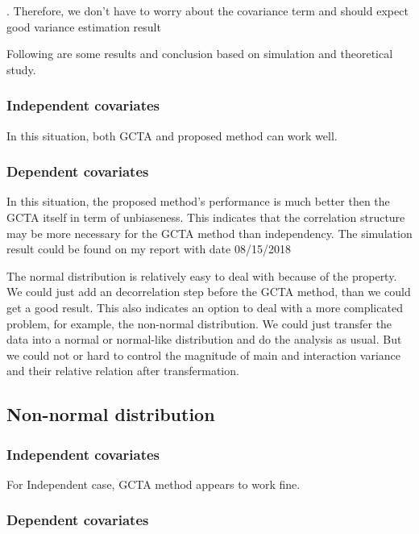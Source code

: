 \documentclass[]{article}
\begin{document}
. Therefore, we don't have to worry about the covariance term and should
expect good variance estimation result

Following are some results and conclusion based on simulation and
theoretical study.

\subsubsection{Independent covariates}\label{independent-covariates}

In this situation, both GCTA and proposed method can work well.

\subsubsection{Dependent covariates}\label{dependent-covariates}

In this situation, the proposed method's performance is much better then
the GCTA itself in term of unbiaseness. This indicates that the
correlation structure may be more necessary for the GCTA method than
independency. The simulation result could be found on my report with
date 08/15/2018

The normal distribution is relatively easy to deal with because of the
property. We could just add an decorrelation step before the GCTA
method, than we could get a good result. This also indicates an option
to deal with a more complicated problem, for example, the non-normal
distribution. We could just transfer the data into a normal or
normal-like distribution and do the analysis as usual. But we could not
or hard to control the magnitude of main and interaction variance and
their relative relation after transfermation.

\subsection{Non-normal distribution}\label{non-normal-distribution}

\subsubsection{Independent covariates}\label{independent-covariates-1}

For Independent case, GCTA method appears to work fine.

\subsubsection{Dependent covariates}\label{dependent-covariates-1}
\end{document}
